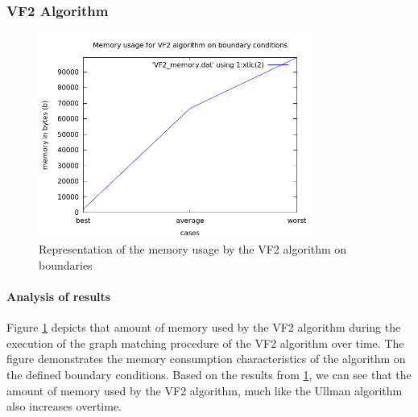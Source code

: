 \subsubsection{VF2 Algorithm}
\begin{figure}[H]
  \begin{center}
      \includegraphics[width=0.8\textwidth]{vf2_memory.png}
  \end{center}    
  \caption{Representation of the memory usage by the VF2 algorithm on boundaries}
  \label{fig:case_vf2_memory}
\end{figure} 

\paragraph{Analysis of results}
Figure \ref{fig:case_vf2_memory} depicts that amount of memory used by the VF2 algorithm during the execution of the graph matching procedure of the VF2 
algorithm over time. The figure demonstrates the memory consumption characteristics of the algorithm on the defined boundary conditions.\newline\newline
Based on the results from \ref{fig:case_vf2_memory}, we can see that the amount of memory used by the VF2 algorithm, much like the Ullman algorithm also 
increases overtime.

